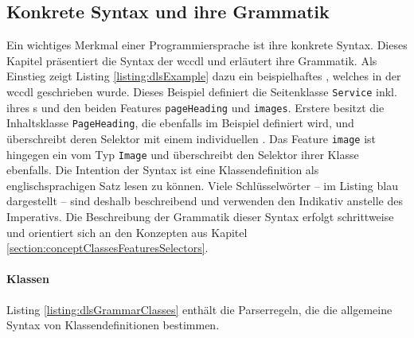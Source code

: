 \subsection{Konkrete Syntax und ihre Grammatik}
    Ein wichtiges Merkmal einer Programmiersprache ist ihre konkrete Syntax.
    Dieses Kapitel präsentiert die Syntax der \gls{wccdl} und erläutert ihre Grammatik.    
    Als Einstieg zeigt Listing \ref{listing:dlsExample}
    dazu ein beispielhaftes {\classificationModel},
    welches in der \gls{wccdl} geschrieben wurde.
    Dieses Beispiel definiert die Seitenklasse \texttt{Service} inkl.
    ihres {\urlSelector}s und den beiden Features \texttt{pageHeading} und \texttt{images}.
    Erstere besitzt die Inhaltsklasse \texttt{PageHeading}, die ebenfalls im Beispiel definiert wird,
    und überschreibt deren Selektor mit einem individuellen {\cssSelector}.
    Das Feature \texttt{image} ist hingegen ein {} vom Typ
    \texttt{Image} und überschreibt den Selektor ihrer Klasse ebenfalls.
    Die Intention der Syntax ist eine Klassendefinition
    als englischsprachigen Satz lesen zu können.
    Viele Schlüsselwörter -- im Listing blau dargestellt --
    sind deshalb beschreibend und verwenden
    den Indikativ anstelle des Imperativs.  
    Die Beschreibung der Grammatik dieser Syntax erfolgt schrittweise
    und orientiert sich an den Konzepten aus Kapitel \ref{section:conceptClassesFeaturesSelectors}.
    
    

    \paragraph*{Klassen}
    Listing \ref{listing:dlsGrammarClasses} enthält die Parserregeln,
    die die allgemeine Syntax von Klassendefinitionen bestimmen.

    

